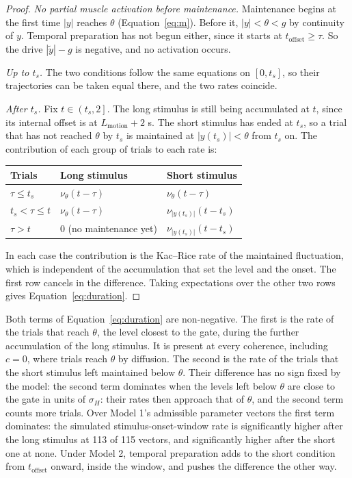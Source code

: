 \documentclass[a4paper,11pt]{article}
\theoremstyle{definition}
\newcommand{\1}{\mathbbm{1}}
\begin{document}
\begin{proof}
\emph{No partial muscle activation before maintenance.} Maintenance begins at the first time $\left|y\right|$ reaches $\theta $ (Equation~\eqref{eq:m}). Before it, $\left|y\right|<\theta <g$ by continuity of $y$. Temporal preparation has not begun either, since it starts at ${t}_{\mathrm{offset}}\ge \tau $. So the drive $\left|\tilde{y}\right|-g$ is negative, and no activation occurs.

\emph{Up to $t_{s}$.} The two conditions follow the same equations on $\left[0,{t}_{s}\right]$, so their trajectories can be taken equal there, and the two rates coincide.

\emph{After $t_{s}$.} Fix $t\in \left({t}_{s},2\right]$. The long stimulus is still being accumulated at $t$, since its internal offset is at ${L}_{\mathrm{motion}}+2$ s. The short stimulus has ended at $t_{s}$, so a trial that has not reached $\theta$ by $t_{s}$ is maintained at $|y(t_{s})|<\theta$ from $t_{s}$ on. The contribution of each group of trials to each rate is:
\begin{center}
\begin{tabular}{lll}
\toprule
Trials & Long stimulus & Short stimulus\\
\midrule
$\tau\le t_{s}$ & $\nu_{\theta}(t-\tau)$ & $\nu_{\theta}(t-\tau)$\\
$t_{s}<\tau\le t$ & $\nu_{\theta}(t-\tau)$ & $\nu_{|y(t_{s})|}(t-t_{s})$\\
$\tau>t$ & 0 (no maintenance yet) & $\nu_{|y(t_{s})|}(t-t_{s})$\\
\bottomrule
\end{tabular}
\end{center}
In each case the contribution is the Kac--Rice rate of the maintained fluctuation, which is independent of the accumulation that set the level and the onset. The first row cancels in the difference. Taking expectations over the other two rows gives Equation~\eqref{eq:duration}.
\end{proof}

Both terms of Equation~\eqref{eq:duration} are non-negative. The first is the rate of the trials that reach $\theta $, the level closest to the gate, during the further accumulation of the long stimulus. It is present at every coherence, including $c=0$, where trials reach $\theta $ by diffusion. The second is the rate of the trials that the short stimulus left maintained below $\theta $. Their difference has no sign fixed by the model: the second term dominates when the levels left below $\theta$ are close to the gate in units of ${\sigma }_{H}$: their rates then approach that of $\theta$, and the second term counts more trials. Over Model 1's admissible parameter vectors the first term dominates: the simulated stimulus-onset-window rate is significantly higher after the long stimulus at 113 of 115 vectors, and significantly higher after the short one at none. Under Model 2, temporal preparation adds to the short condition from ${t}_{\mathrm{offset}}$ onward, inside the window, and pushes the difference the other way.
\end{document}
